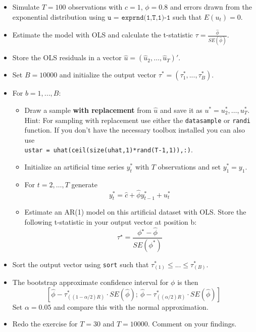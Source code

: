 \documentclass{article}
\begin{document}
\begin{itemize}
	\item Simulate $T=100$ observations with $c=1$, $\phi=0.8$ and errors drawn from the exponential distribution using $\texttt{u = exprnd(1,T,1)-1}$ such that $E(u_t)=0$.
	\item Estimate the model with OLS and calculate the t-statistic $\tau=\frac{\hat{\phi}}{SE(\hat{\phi})}$. 
	\item Store the OLS residuals in a vector $\hat{u} = (\hat{u}_{2},\ldots ,\hat{u}_{T})'$.
	\item Set $B=10000$ and initialize the output vector $\tau^{\ast} = (\tau_1^\ast,...,\tau_B^\ast)$. \item For $b=1,...,B$:
	\begin{itemize}
	\item Draw a sample \textbf{with replacement} from $\hat{u}$ and save it as $u^{\ast} = u_{2}^{\ast},\ldots ,u_{T}^{\ast }$.\\Hint: For sampling with replacement use either the \texttt{datasample} or \texttt{randi} function. If you don't have the necessary toolbox installed you can also use \\\texttt{ustar = uhat(ceil(size(uhat,1)*rand(T-1,1)),:)}.
	\item Initialize an artificial time series $y_t^\ast$ with $T$ observations and set $y_1^\ast = y_1$.
	\item For $t=2,\ldots ,T$ generate
	\begin{equation*}
	y_{t}^{\ast }=\hat{c}+\hat{\phi}y^\ast_{t-1}+u_{t}^{\ast }
	\end{equation*}
	\item Estimate an AR(1) model on this artificial dataset with OLS. Store the following t-statistic in your output vector at position b:
	$$\tau^\star = \frac{\phi^\star - \hat{\phi}}{SE(\phi^\ast)}$$
	\end{itemize}
	\item Sort the output vector using \texttt{sort} such that $\tau_{(1)}^\ast \leq ... \leq \tau_{(B)}^\ast$.
	 \item  The bootstrap approximate confidence interval for $\phi$ is then
	\begin{equation*}
	\left[ \hat{\phi}-\tau_{((1-\alpha /2)R)}^{\ast }\cdot SE(\hat{\phi});\ \hat{\phi}-\tau_{((\alpha/2)R)}^{\ast }\cdot SE(\hat{\phi})\right] 
	\end{equation*}
	Set $\alpha=0.05$ and compare this with the normal approximation.
	\item Redo the exercise for $T=30$ and $T=10000$. Comment on your findings.
\end{itemize}
\end{document}

